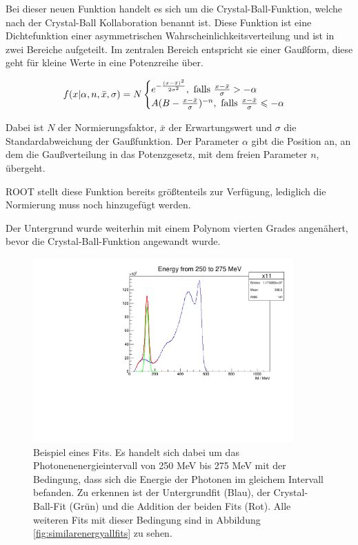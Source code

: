 \documentclass[a4paper,11pt,oneside,final,german,openbib,pdftex]{scrbook}
\begin{document}
{Bei dieser neuen Funktion handelt es sich um die Crystal-Ball-Funktion, welche nach der Crystal-Ball Kollaboration benannt ist. Diese Funktion ist eine Dichtefunktion einer asymmetrischen Wahrscheinlichkeitsverteilung und ist in zwei Bereiche aufgeteilt. Im zentralen Bereich entspricht sie einer Gau{\ss}form, diese geht f\"ur kleine Werte in eine Potenzreihe \"uber.

\begin{equation}
f(x|\alpha,n,\bar{x},\sigma)=N\begin{cases}e^{-\frac{(x-\bar{x})^2}{2\sigma^2}}, \textnormal{  falls $\frac{x-\bar{x}}{\sigma}> -\alpha$} \\
A(B-\frac{x-\bar{x}}{\sigma})^{-n}, \textnormal{  falls $\frac{x-\bar{x}}{\sigma}\leqslant -\alpha$} 
\end{cases}
\label{eq:Crystal-Ball-Funktion}
\end{equation}

Dabei ist $N$ der Normierungsfaktor, $\bar{x}$ der Erwartungswert und $\sigma$ die Standardabweichung der Gau{\ss}funktion. Der Parameter $\alpha$ gibt die Position an, an dem die Gau{\ss}verteilung in das Potenzgesetz, mit dem freien Parameter $n$, \"ubergeht\cite{Cern15}. 

ROOT stellt diese Funktion bereits gr\"o{\ss}tenteils zur Verf\"ugung, lediglich die Normierung muss noch hinzugef\"ugt werden.

Der Untergrund wurde weiterhin mit einem Polynom vierten Grades angen\"ahert, bevor die Crystal-Ball-Funktion angewandt wurde.

\begin{figure}[h!]
	\begin{center}
		\includegraphics[width=100mm]{NewCalib/Strahlzeit2014/20171904RealIntervalFitExample}
		
		\caption[Strahlzeit: Beispielfit f\"ur die Crystal-Ball-Fitfunktion]{Beispiel eines Fits. Es handelt sich dabei um das Photonenenergieintervall von 250 MeV bis 275 MeV mit der Bedingung, dass sich die Energie der Photonen im gleichem Intervall befanden.
			Zu erkennen ist der Untergrundfit (Blau), der Crystal-Ball-Fit (Gr\"un) und die Addition der beiden Fits (Rot). Alle weiteren Fits mit dieser Bedingung sind in Abbildung \ref{fig:similarenergyallfits} zu sehen.
		}
		\label{fig:fitexampleenergyinterval0903}	
	\end{center}
\end{figure}

}
\end{document}
